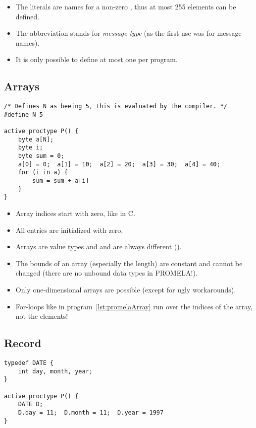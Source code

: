 			\begin{itemize}
				\item The literals are names for a non-zero , thus at most 255 elements can be defined.
				\item The abbreviation  stands for \textit{message type} (as the first use was for message names).
				\item It is only possible to define at most one  per program.
			\end{itemize}

		\subsection{Arrays}
			\begin{lstlisting}[caption = { PROMELA Arrays }, label = lst:promelaArray, language = PROMELA]
/* Defines N as beeing 5, this is evaluated by the compiler. */
#define N 5

active proctype P() {
	byte a[N];
	byte i;
	byte sum = 0;
	a[0] = 0;  a[1] = 10;  a[2] = 20;  a[3] = 30;  a[4] = 40;
	for (i in a) {
		sum = sum + a[i]
	}
}
			\end{lstlisting}
		
			\begin{itemize}
				\item Array indices start with zero, like in C.
				\item All entries are initialized with zero.
				\item Arrays are value types and  and  are always different ().
				\item The bounds of an array (especially the length) are constant and cannot be changed (there are no unbound data types in PROMELA!).
				\item Only one-dimensional arrays are possible (except for ugly workarounds).
				\item For-loops like in program~\ref{lst:promelaArray} run over the indices of the array, not the elements!
			\end{itemize}

		\subsection{Record}
			\begin{lstlisting}[caption = { PROMELA Records }, label = lst:promelaRecord, language = PROMELA]
typedef DATE {
	int day, month, year;
}

active proctype P() {
	DATE D;
	D.day = 11;  D.month = 11;  D.year = 1997
}
			\end{lstlisting}
			
